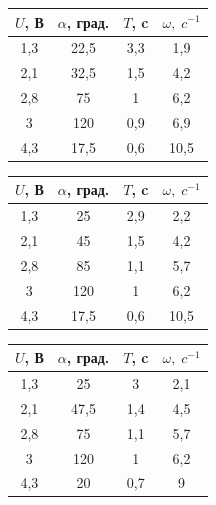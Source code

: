 \documentclass[a4paper]{article}
\begin{document}
\begin{figure}[htb]
	\begin{minipage}[b]{0.3\textwidth}
			\begin{tabular}{|c|c|c|c|}
				\hline
				$U$, В&$\alpha$, град.& $T$, c& $\omega,\;c^{-1}$  \\
				\hline
				1,3&  22,5&   3,3&1,9\\
				
				2,1& 32,5 &1,5   &4,2\\
				
				2,8& 75 &  1 &6,2\\
				
				3& 120 &  0,9 &6,9\\
				
				4,3& 17,5 &  0,6 &10,5\\
				\hline
			\end{tabular}
	\end{minipage}
\hfill
	\begin{minipage}[b]{0.3\textwidth}
		\begin{tabular}{|c|c|c|c|}
			\hline
			$U$, В&$\alpha$, град.& $T$, c& $\omega,\;c^{-1}$  \\
			\hline
			1,3&  25&   2,9&2,2\\
			
			2,1& 45&1,5   &4,2\\
			
			2,8& 85 &  1,1 &5,7\\
			
			3& 120 &  1 &6,2\\
			
			4,3& 17,5 &  0,6 &10,5\\
			\hline
		\end{tabular}
\end{minipage}
\hfill
	\begin{minipage}[b]{0.3\textwidth}
		\begin{tabular}{|c|c|c|c|}
			\hline
			$U$, В&$\alpha$, град.& $T$, c& $\omega,\;c^{-1}$  \\
			\hline
			1,3&  25&   3&2,1\\
			
			2,1& 47,5 &1,4   &4,5\\
			
			2,8& 75 &  1,1 &5,7\\
			
			3& 120 &  1 &6,2\\
			
			4,3& 20 &  0,7 &9\\
			\hline
		\end{tabular}
\end{minipage}
\end{figure}
\end{document}

